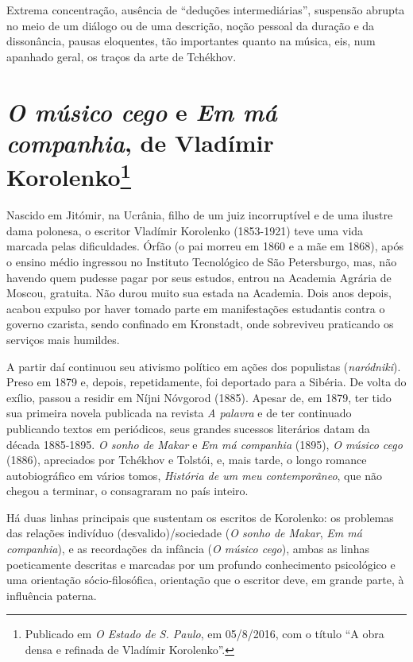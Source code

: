 Extrema concentração, ausência de ``deduções intermediárias'',
suspensão abrupta no meio de um diálogo ou de uma descrição,
noção pessoal da duração e da dissonância, pausas eloquentes,
tão importantes quanto na música, eis, num apanhado geral, os
traços da arte de Tchékhov.

\chapter{\emph{O músico cego} e \emph{Em má companhia}, de
Vladímir Korolenko\footnote{Publicado em \emph{O Estado de S.
Paulo}, em 05/8/2016, com o título ``A obra densa e refinada de Vladímir Korolenko''.}}
\label{korolenko}

Nascido em Jitómir, na Ucrânia, filho de um juiz incorruptível e
de uma ilustre dama polonesa, o escritor Vladímir Korolenko
(1853-1921) teve uma vida marcada pelas dificuldades. Órfão (o
pai morreu em 1860 e a mãe em 1868), após o ensino médio ingressou
no Instituto Tecnológico de São Petersburgo, mas, não havendo quem
pudesse pagar por seus estudos, entrou na Academia Agrária de Moscou,
gratuita. Não durou muito sua estada na Academia. Dois anos depois,
acabou expulso por haver tomado parte em manifestações estudantis
contra o governo czarista, sendo confinado em Kronstadt, onde sobreviveu
praticando os serviços mais humildes.

A partir daí continuou seu ativismo político em ações dos
populistas (\emph{naródniki}). Preso em 1879 e, depois,
repetidamente, foi deportado para a Sibéria. De volta do
exílio, passou a residir em Níjni Nóvgorod (1885). Apesar de,
em 1879, ter tido sua primeira novela publicada na revista
\emph{A palavra} e de ter continuado publicando
textos em periódicos, seus grandes sucessos literários datam da
década 1885-1895. \emph{O sonho de Makar} e \emph{Em má companhia}
(1895), \emph{O músico cego} (1886), apreciados por Tchékhov e
Tolstói, e, mais tarde, o longo romance autobiográfico em vários
tomos, \emph{História de um meu contemporâneo}, que não chegou a
terminar, o consagraram no país inteiro.

Há duas linhas principais que sustentam os escritos de Korolenko:
os problemas das relações indivíduo (desvalido)/sociedade (\emph{O
sonho de Makar}, \emph{Em má companhia}), e as recordações da
infância (\emph{O músico cego}), ambas as linhas poeticamente
descritas e marcadas por um profundo conhecimento psicológico e
uma orientação sócio-filosófica, orientação que o escritor deve,
em grande parte, à influência paterna.

